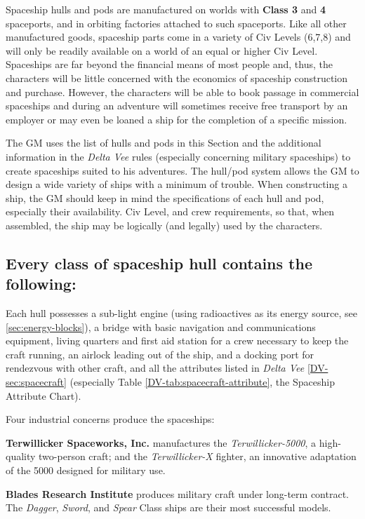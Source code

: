 Spaceship hulls and pods are manufactured on worlds with \textbf{Class
3} and \textbf{4} spaceports, and in orbiting factories
attached to such spaceports. Like all other manufactured goods,
spaceship parts come in a variety of Civ Levels (6,7,8) and will only
be readily available on a world of an equal or higher Civ Level.
Spaceships are far beyond the financial means of most people and,
thus, the characters will be little concerned with the economics of
spaceship construction and purchase. However, the characters will be
able to book passage in commercial spaceships and during an adventure
will sometimes receive free transport by an employer or may even be
loaned a ship for the completion of a specific mission.

The GM uses the list of hulls and pods in this Section and the
additional information in the \emph{Delta Vee} rules (especially
concerning military spaceships) to create spaceships suited to his
adventures. The hull/pod system allows the GM to design a wide variety
of ships with a minimum of trouble. When constructing a ship, the GM
should keep in mind the specifications of each hull and pod,
especially their availability. Civ Level, and crew requirements, so
that, when assembled, the ship may be logically (and legally) used by
the characters.

\subsection[Hull Classes]{Every class of spaceship hull contains the
  following:} 
\label{sec:hull-classes}

Each hull possesses a sub-light engine
(using radioactives as its energy source, see \ref{sec:energy-blocks}), a
bridge with basic navigation and communications equipment, living
quarters and first aid station for a crew necessary to keep the craft
running, an airlock leading out of the ship, and a docking port for
rendezvous with other craft, and all the attributes listed in
\emph{Delta Vee} \ref{DV-sec:spacecraft} (especially Table
\ref{DV-tab:spacecraft-attribute}, 
the Spaceship Attribute Chart). 


Four industrial concerns produce the spaceships: 

\textbf{Terwillicker Spaceworks, Inc.} manufactures the
\emph{Terwillicker-5000}, a high-quality two-person craft; and the
\emph{Terwillicker-X} fighter, an innovative adaptation of the 5000
designed for military use.

\textbf{Blades Research Institute} produces military craft under
long-term contract. The \emph{Dagger}, \emph{Sword}, and \emph{Spear}
Class ships are their most successful models.

